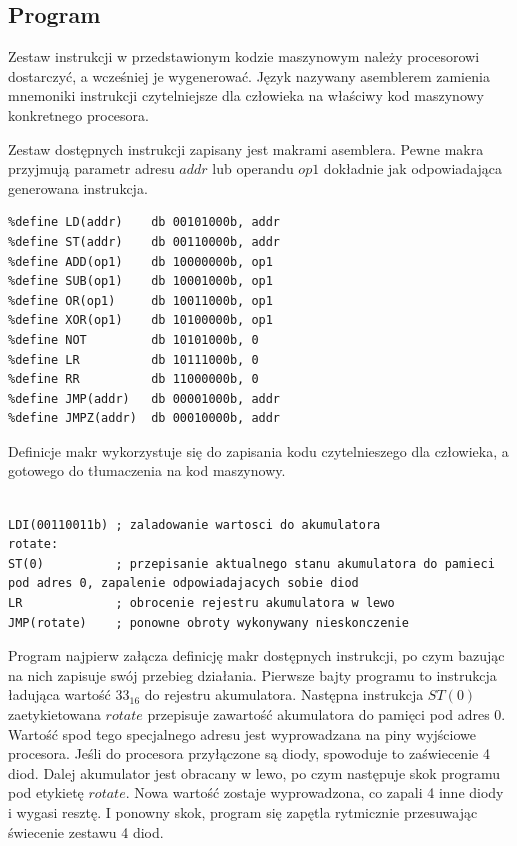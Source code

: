 \documentclass[a4paper,12pt]{article}
\begin{document}
\subsection{Program}

Zestaw instrukcji w przedstawionym kodzie maszynowym należy procesorowi dostarczyć, a wcześniej je wygenerować. Język nazywany asemblerem zamienia mnemoniki instrukcji czytelniejsze dla człowieka na właściwy kod maszynowy konkretnego procesora.

Zestaw dostępnych instrukcji zapisany jest makrami asemblera. Pewne makra przyjmują parametr adresu $addr$ lub operandu $op1$ dokładnie jak odpowiadająca generowana instrukcja.
\begin{lstlisting}[label=Instrukcje,caption=Instructions.asm]
%define LDI(op1)    db 00000000b, op1
%define LD(addr)    db 00101000b, addr
%define ST(addr)    db 00110000b, addr
%define ADD(op1)    db 10000000b, op1
%define SUB(op1)    db 10001000b, op1
%define OR(op1)     db 10011000b, op1
%define XOR(op1)    db 10100000b, op1
%define NOT         db 10101000b, 0
%define LR          db 10111000b, 0
%define RR          db 11000000b, 0
%define JMP(addr)   db 00001000b, addr
%define JMPZ(addr)  db 00010000b, addr
\end{lstlisting}

Definicje makr wykorzystuje się do zapisania kodu czytelnieszego dla człowieka, a gotowego do tłumaczenia na kod maszynowy.

\begin{lstlisting}[label=Diods,caption=Diods.asm]
%include "instructions.asm"

LDI(00110011b) ; zaladowanie wartosci do akumulatora
rotate:
ST(0)          ; przepisanie aktualnego stanu akumulatora do pamieci pod adres 0, zapalenie odpowiadajacych sobie diod
LR             ; obrocenie rejestru akumulatora w lewo
JMP(rotate)    ; ponowne obroty wykonywany nieskonczenie
\end{lstlisting}
Program najpierw załącza definicję makr dostępnych instrukcji, po czym bazując na nich zapisuje swój przebieg działania. Pierwsze bajty programu to instrukcja ładująca wartość $33_{16}$ do rejestru akumulatora. Następna instrukcja $ST(0)$ zaetykietowana $rotate$ przepisuje zawartość akumulatora do pamięci pod adres $0$. Wartość spod tego specjalnego adresu jest wyprowadzana na piny wyjściowe procesora. Jeśli do procesora przyłączone są diody, spowoduje to zaświecenie 4 diod. Dalej akumulator jest obracany w lewo, po czym następuje skok programu pod etykietę $rotate$. Nowa wartość zostaje wyprowadzona, co zapali 4 inne diody i wygasi resztę. I ponowny skok, program się zapętla rytmicznie przesuwając świecenie zestawu 4 diod.
\end{document}
